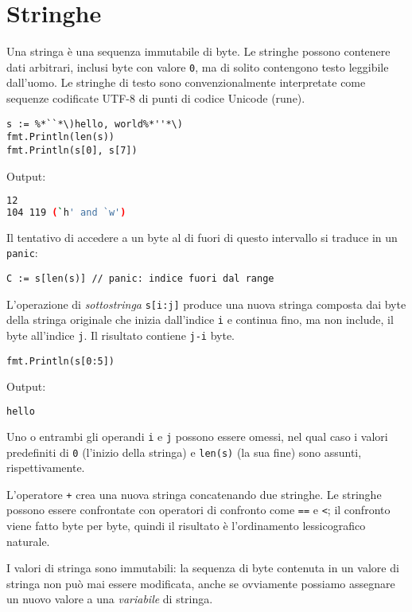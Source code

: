 \section{Stringhe}
\label{sec:stringhe}%
Una stringa è una sequenza immutabile di byte.
Le stringhe possono contenere dati arbitrari, inclusi byte con valore \verb|0|, ma di solito contengono testo leggibile dall'uomo.
Le stringhe di testo sono convenzionalmente interpretate come sequenze codificate UTF-8 di punti di codice Unicode (rune).
\begin{lstlisting}[frame = single, label = {lst:lstlisting2.1}]
s := %*``*\)hello, world%*''*\)
fmt.Println(len(s))
fmt.Println(s[0], s[7])
\end{lstlisting}
Output:
\begin{lstlisting}[language = bash, frame = L, label = {lst:lstlisting2.2}]
12
104 119 (`h' and `w')
\end{lstlisting}
Il tentativo di accedere a un byte al di fuori di questo intervallo si traduce in un \verb|panic|:
\begin{lstlisting}[frame = single, label = {lst:lstlisting2.3}]
C := s[len(s)] // panic: indice fuori dal range
\end{lstlisting}
L'operazione di \textit{sottostringa} \verb|s[i:j]| produce una nuova stringa composta dai byte della stringa originale che inizia dall'indice \verb|i| e continua fino, ma non include, il byte all'indice \verb|j|.
Il risultato contiene \verb|j-i| byte.
\begin{lstlisting}[frame = single, label = {lst:lstlisting2.4}]
fmt.Println(s[0:5])
\end{lstlisting}
Output:
\begin{lstlisting}[language = bash, frame = L, label = {lst:lstlisting2-2.5}]
hello
\end{lstlisting}
Uno o entrambi gli operandi \verb|i| e \verb|j| possono essere omessi, nel qual caso i valori predefiniti di \verb|0| (l'inizio della stringa) e \verb|len(s)| (la sua fine) sono assunti, rispettivamente.

L'operatore \verb|+| crea una nuova stringa concatenando due stringhe.
Le stringhe possono essere confrontate con operatori di confronto come \verb|==| e \verb|<|;
il confronto viene fatto byte per byte, quindi il risultato è l'ordinamento lessicografico naturale.

I valori di stringa sono immutabili: la sequenza di byte contenuta in un valore di stringa non può mai essere modificata, anche se ovviamente possiamo assegnare un nuovo valore a una \textit{variabile} di stringa.


